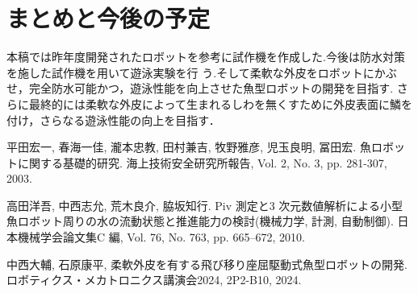 \documentclass{jarticle}
\begin{document}
\section{まとめと今後の予定}

本稿では昨年度開発されたロボットを参考に試作機を作成した.今後は防水対策を施した試作機を用いて遊泳実験を行
う.そして柔軟な外皮をロボットにかぶせ，完全防水可能かつ，遊泳性能を向上させた魚型ロボットの開発を目指す.
さらに最終的には柔軟な外皮によって生まれるしわを無くすために外皮表面に鱗を付け，さらなる遊泳性能の向上を目指す．



% 
% 


\begin{thebibliography}{99}

   平田宏一, 春海一佳, 瀧本忠教, 田村兼吉, 牧野雅彦, 児玉良明, 冨田宏. 魚ロボットに関する基礎的研究. 海上技術安全研究所報告, Vol. 2, No. 3, pp. 281-307, 2003.

   高田洋吾, 中西志允, 荒木良介, 脇坂知行. Piv 測定と3 次元数値解析による小型魚ロボット周りの水の流動状態と推進能力の検討(機械力学, 計測, 自動制御). 日本機械学会論文集C 編, Vol. 76, No. 763, pp. 665–672, 2010.

   中西大輔, 石原康平, 柔軟外皮を有する飛び移り座屈駆動式魚型ロボットの開発. ロボティクス・メカトロニクス講演会2024, 2P2-B10, 2024.

\end{thebibliography}
\end{document}
